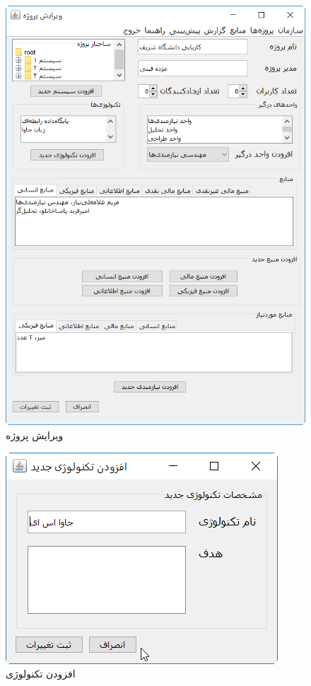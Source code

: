 \begin{figure}[H]
	\centering
	\includegraphics[scale=0.8]{img/prot/EditProject}
	\caption{ویرایش ‌پروژه }
\end{figure}
\begin{figure}[H]
	\centering
	\includegraphics[scale=0.8]{img/prot/AddTechnology}
	\caption{افزودن ‌تکنولوژی }
\end{figure}
